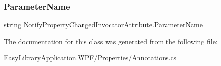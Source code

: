 \subsubsection{\texorpdfstring{Parameter\+Name}{ParameterName}}
{\footnotesize\ttfamily string Notify\+Property\+Changed\+Invocator\+Attribute.\+Parameter\+Name\hspace{0.3cm}{\ttfamily [get]}}



The documentation for this class was generated from the following file\+:\begin{DoxyCompactItemize}
\item 
Easy\+Library\+Application.\+W\+P\+F/\+Properties/\mbox{\hyperlink{_annotations_8cs}{Annotations.\+cs}}\end{DoxyCompactItemize}
